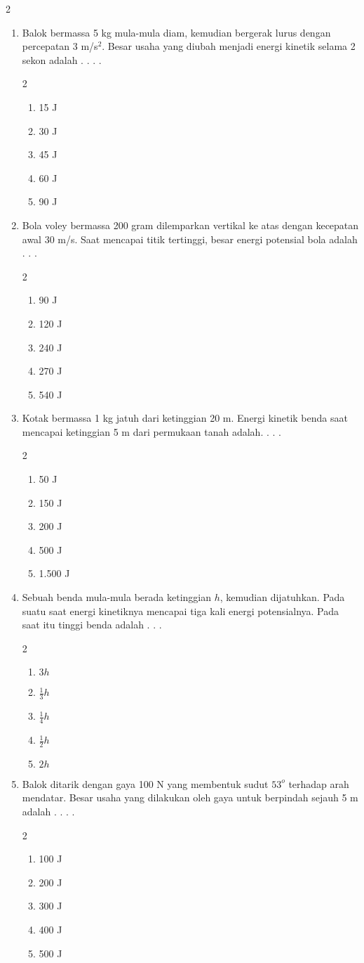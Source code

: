 \documentclass[10pt,a4paper]{article}
\newcommand{\pilgani}[1]{                            \vspace{-0.3cm}\begin{multicols}{2}
 \begin{enumerate}[label=\Alph*., itemsep=0pt,topsep=0pt,leftmargin=*,align=Center]#1                     \end{enumerate}
 \phantom{ini cuma sapi, wedus, dan ayam}
 \end{multicols}}
\begin{document}
\begin{multicols*} {2}
\begin{enumerate}
    \item Balok bermassa 5 kg mula-mula diam, kemudian bergerak lurus dengan percepatan 3 m/s$^2$. Besar usaha yang diubah menjadi energi kinetik selama 2 sekon adalah . . . .
    \pilgani{
    \item 15 J
    \item 30 J
    \item 45 J
    \item 60 J
    \item 90 J
    }
    \vspace {3cm}
    
    \item Bola voley bermassa 200 gram dilemparkan vertikal ke atas dengan kecepatan awal 30 m/s. Saat mencapai titik tertinggi, besar energi potensial bola adalah . . . 
    \pilgani{
    \item 90 J
    \item 120 J
    \item 240 J
    \item 270 J
    \item 540 J
    } \vspace {3cm}
    
    \item Kotak bermassa 1 kg jatuh dari ketinggian 20 m. Energi kinetik benda saat mencapai ketinggian 5 m dari permukaan tanah adalah. . . . 
    \pilgani{
    \item 50 J
    \item 150 J
    \item 200 J
    \item 500 J
    \item 1.500 J
    } \vspace{3cm}
    
    \item Sebuah benda mula-mula berada ketinggian $h$, kemudian dijatuhkan. Pada suatu saat energi kinetiknya mencapai tiga kali energi potensialnya. Pada saat itu tinggi benda adalah . . . 
    \pilgani{
    \item $3h$
    \item $\frac {1}{3}h$
    \item $\frac{1}{4}h$
    \item $\frac{1}{2}h$
    \item $2h$
    }
    \vspace{3cm}
    
    \item Balok ditarik dengan gaya 100 N yang membentuk sudut $53^o$ terhadap arah mendatar. Besar usaha yang dilakukan oleh gaya untuk berpindah sejauh 5 m adalah . . . .
    \pilgani{
    \item 100 J
    \item 200 J
    \item 300 J
    \item 400 J
    \item 500 J
    } 
    \vspace{3cm}
    

\end{enumerate}
\end{multicols*}
\end{document}
